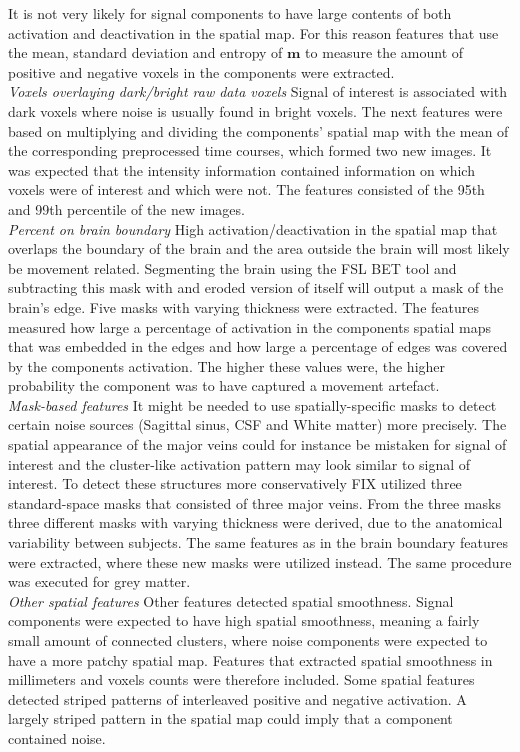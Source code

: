 It is not very likely for signal components to have large contents of both activation and deactivation in the spatial map. For this reason features that use the mean, standard deviation and entropy of $\mathbf{m}$ to measure the amount of positive and negative voxels in the components were extracted. \\
\textit{Voxels overlaying dark/bright raw data voxels}
Signal of interest is associated with dark voxels where noise is usually found in bright voxels. The next features were based on multiplying and dividing the components’ spatial map with the mean of the corresponding preprocessed time courses, which formed two new images. It was expected that the intensity information contained information on which voxels were of interest and which were not. The features consisted of the 95th and 99th percentile of the new images. \\
\textit{Percent on brain boundary} High activation/deactivation in the spatial map that overlaps the boundary of the brain and the area outside the brain will most likely be movement related. Segmenting the brain using the FSL BET tool and subtracting this mask with and eroded version of itself will output a mask of the brain’s edge. Five masks with varying thickness were extracted. The features measured how large a percentage of activation in the components spatial maps that was embedded in the edges and how large a percentage of edges was covered by the components activation. The higher these values were, the higher probability the component was to have captured a movement artefact. \\
\textit{Mask-based features} It might be needed to use spatially-specific masks to detect certain noise sources (Sagittal sinus, CSF and White matter) more precisely. The spatial appearance of the major veins could for instance be mistaken for signal of interest and the cluster-like activation pattern may look similar to signal of interest. To detect these structures more conservatively FIX utilized three standard-space masks that consisted of three major veins. From the three masks three different masks with varying thickness were derived, due to the anatomical variability between subjects. The same features as in the brain boundary features were extracted, where these new masks were utilized instead. The same procedure was executed for grey matter. \\
\textit{Other spatial features} Other features detected spatial smoothness. Signal components were expected to have high spatial smoothness, meaning a fairly small amount of connected clusters, where noise components were expected to have a more patchy spatial map. Features that extracted spatial smoothness in millimeters and voxels counts were therefore included. Some spatial features detected striped patterns of interleaved positive and negative activation. A largely striped pattern in the spatial map could imply that a component contained noise. \cite{Salimi-Khorshidi2014}




